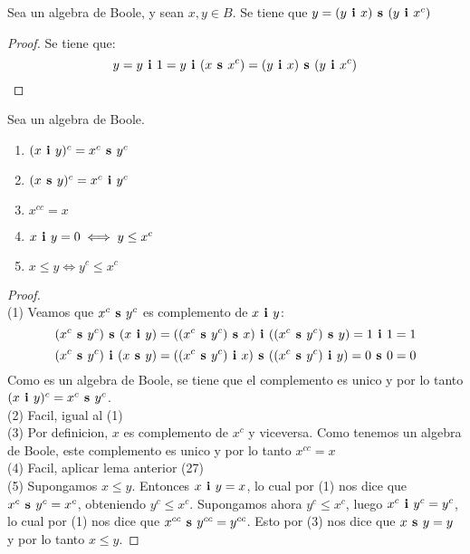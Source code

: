 \begin{lemma}
  Sea \algBoole un algebra de Boole, y sean $x, y \in B$. Se tiene que $y = (y\textbf{ i }x)\textbf{ s }(y\textbf{ i }x^c)$
\end{lemma}
\begin{proof}
  Se tiene que:
  $$
  y = y\textbf{ i }1 = y\textbf{ i }(x\textbf{ s }x^c) = (y\textbf{ i }x)\textbf{ s }(y\textbf{ i }x^c)
  $$
\end{proof}

\begin{theorem}
  Sea \algBoole un algebra de Boole.
  \begin{enumerate}
    \item $(x\textbf{ i }y)^c = x^c\textbf{ s }y^c$
    \item $(x\textbf{ s }y)^c = x^c\textbf{ i }y^c$
    \item $x^{cc} = x$
    \item $x\textbf{ i }y = 0 \iff y \leq x^c$
    \item $x\leq y \iff y^c \leq x^c$
  \end{enumerate}
\end{theorem}
\begin{proof}
  $ $\\
  (1) Veamos que $x^c\textbf{ s }y^c$ es complemento de $x\textbf{ i }y$:
  $$
  (x^c\textbf{ s }y^c)\textbf{ s }(x\textbf{ i }y) = ((x^c\textbf{ s }y^c)\textbf{ s }x)\textbf{ i }((x^c\textbf{ s }y^c)\textbf{ s }y) = 1\textbf{ i }1 = 1
  $$
  $$
  (x^c\textbf{ s }y^c)\textbf{ i }(x\textbf{ s }y) = ((x^c\textbf{ s }y^c)\textbf{ i }x)\textbf{ s }((x^c\textbf{ s }y^c)\textbf{ i }y) = 0\textbf{ s }0 = 0
  $$
  Como es un algebra de Boole, se tiene que el complemento es unico y por lo tanto $(x\textbf{ i }y)^c = x^c\textbf{ s }y^c$.\\
  (2) Facil, igual al (1)\\
  (3) Por definicion, $x$ es complemento de $x^c$ y viceversa. Como tenemos un algebra de Boole, este complemento es unico y por lo tanto $x^{cc} = x$\\
  (4) Facil, aplicar lema anterior (27)\\
  (5) Supongamos $x \leq y$. Entonces $x\textbf{ i }y = x$, lo cual por (1) nos dice que $x^c\textbf{ s }y^c = x^c$,
  obteniendo $y^c \leq x^c$. Supongamos ahora $y^c \leq x^c$, luego $x^c\textbf{ i }y^c = y^c$, lo cual por (1) nos dice que $x^{cc}\textbf{ s }y^{cc} = y^{cc}$.
  Esto por (3) nos dice que $x\textbf{ s }y = y$ y por lo tanto $x \leq y$.
\end{proof}

